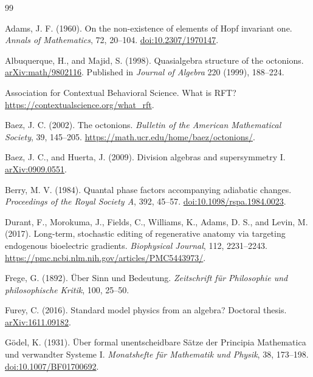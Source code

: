\documentclass[11pt,a4paper]{article}
\begin{document}
\begin{thebibliography}{99}
\raggedright
{}
Adams, J. F. (1960). On the non-existence of elements of Hopf invariant one.
\emph{Annals of Mathematics}, 72, 20--104.
\href{https://doi.org/10.2307/1970147}{doi:10.2307/1970147}.

Albuquerque, H., and Majid, S. (1998). Quasialgebra structure of the octonions.
\href{https://arxiv.org/abs/math/9802116}{arXiv:math/9802116}.
Published in \emph{Journal of Algebra} 220 (1999), 188--224.

Association for Contextual Behavioral Science. What is RFT?
\url{https://contextualscience.org/what_rft}.

Baez, J. C. (2002). The octonions. \emph{Bulletin of the American Mathematical
Society}, 39, 145--205. \url{https://math.ucr.edu/home/baez/octonions/}.

Baez, J. C., and Huerta, J. (2009). Division algebras and supersymmetry I.
\href{https://arxiv.org/abs/0909.0551}{arXiv:0909.0551}.

Berry, M. V. (1984). Quantal phase factors accompanying adiabatic changes.
\emph{Proceedings of the Royal Society A}, 392, 45--57.
\href{https://doi.org/10.1098/rspa.1984.0023}{doi:10.1098/rspa.1984.0023}.

Durant, F., Morokuma, J., Fields, C., Williams, K., Adams, D. S., and Levin, M.
(2017). Long-term, stochastic editing of regenerative anatomy via targeting
endogenous bioelectric gradients. \emph{Biophysical Journal}, 112, 2231--2243.
\url{https://pmc.ncbi.nlm.nih.gov/articles/PMC5443973/}.

Frege, G. (1892). \"Uber Sinn und Bedeutung.
\emph{Zeitschrift f\"ur Philosophie und philosophische Kritik}, 100, 25--50.

Furey, C. (2016). Standard model physics from an algebra?
Doctoral thesis. \href{https://arxiv.org/abs/1611.09182}{arXiv:1611.09182}.

G\"odel, K. (1931). \"Uber formal unentscheidbare S\"atze der Principia
Mathematica und verwandter Systeme I. \emph{Monatshefte f\"ur Mathematik
und Physik}, 38, 173--198. \href{https://doi.org/10.1007/BF01700692}{doi:10.1007/BF01700692}.


\end{thebibliography}
\end{document}
